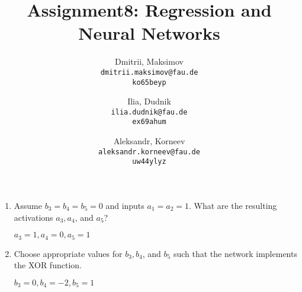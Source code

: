 \documentclass{homework}
\title{Assignment8: Regression and Neural Networks}
\author{
  Dmitrii, Maksimov\\
  \texttt{dmitrii.maksimov@fau.de} \\
  \texttt{ko65beyp}
  \and
  Ilia, Dudnik\\
  \texttt{ilia.dudnik@fau.de}\\
  \texttt{ex69ahum}
  \and
  Aleksandr, Korneev\\
  \texttt{aleksandr.korneev@fau.de}\\
  \texttt{uw44ylyz}
}
\begin{document}
\maketitle


\begin{enumerate}
	\item Assume $b_3=b_4=b_5=0$ and inputs $a_1=a_2=1$. What are the resulting activations $a_3, a_4$,  and $a_5$?
	
	$a_3 = 1, a_4=0,a_5=1$
	\item Choose appropriate values for $b_3, b_4$, and $b_5$ such that the network implements the XOR function.

	$b_3=0, b_4=-2,b_5=1$
\end{enumerate}
\end{document}
